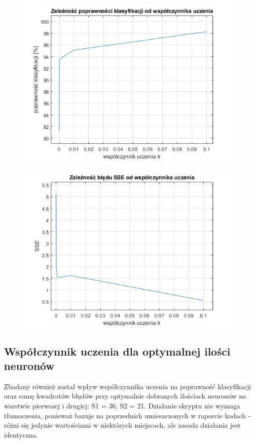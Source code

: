 \documentclass[a4paper, 12pt]{report}
\begin{document}
\begin{figure}[hbt!]
\includegraphics[width=14cm]{srednia pk}
\centering
\end{figure}
\begin{figure}[hbt!]

\includegraphics[width=14cm]{srednia sse}
\centering
\end{figure}

\newpage
\subsection{Współczynnik uczenia dla optymalnej ilości neuronów}

Zbadany również został wpływ współczynnika uczenia na poprawność klasyfikacji oraz sumę kwadratów błędów przy optymalnie dobranych ilościach neuronów na warstwie pierwszej i drugiej: S1 = 36, S2 = 21. Działanie skryptu nie wymaga tłumaczenia, ponieważ  bazuje na poprzednich umieszczonych w raporcie kodach - różni się jedynie wartościami w niektórych miejscach, ale zasada działania jest identyczna.
\end{document}
